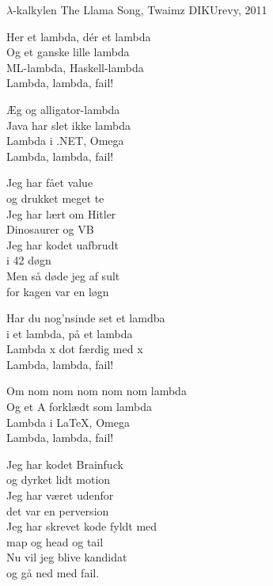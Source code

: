 \begin{song}{$\lambda$-kalkylen}
  {} %
  {The Llama Song, Twaimz} %
  {} %
  {DIKUrevy, 2011} %
  {\NotCCLIed} %

  \begin{SBChorus}
    Her et lambda, dér et lambda\\
    Og et ganske lille lambda\\
    ML-lambda, Haskell-lambda\\
    Lambda, lambda, fail!
  \end{SBChorus}

  \begin{SBChorus}
    Æg og alligator-lambda\\
    Java har slet ikke lambda\\
    Lambda i .NET, Omega\\
    Lambda, lambda, fail!
  \end{SBChorus}

  \begin{SBVerse}
    Jeg har fået value\\
    og drukket meget te\\
    Jeg har lært om Hitler\\
    Dinosaurer og VB\\
    Jeg har kodet uafbrudt\\
    i 42 døgn\\
    Men så døde jeg af sult\\
    for kagen var en løgn
  \end{SBVerse}

  \begin{SBChorus}
    Har du nog'nsinde set et lamdba\\
    i et lambda, på et lambda\\
    Lambda x dot færdig med x\\
    Lambda, lambda, fail!
  \end{SBChorus}

  \begin{SBChorus}
    Om nom nom nom nom nom lambda\\
    Og et A forklædt som lambda\\
    Lambda i \LaTeX, Omega\\
    Lambda, lambda, fail!
  \end{SBChorus}

  \begin{SBVerse}
    Jeg har kodet Brainfuck\\
    og dyrket lidt motion\\
    Jeg har været udenfor\\
    det var en perversion\\
    Jeg har skrevet kode fyldt med\\
    map og head og tail\\
    Nu vil jeg blive kandidat\\
    og gå ned med fail.
  \end{SBVerse}
\end{song}